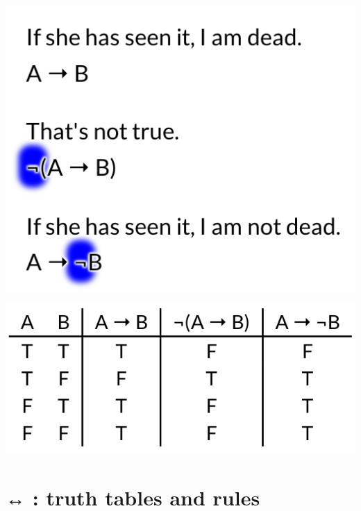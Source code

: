 \documentclass[12pt]{extarticle}
\begin{document}
\begin{multicols*}{3}
\begin{center}
\includegraphics[scale=0.3]{img/not_if.png}
\end{center}
\begin{center}
\includegraphics[scale=0.3]{img/not_if_tt.png}
\end{center}
 
 
\section{↔ : truth tables and rules}
 

\end{multicols*}
\end{document}
